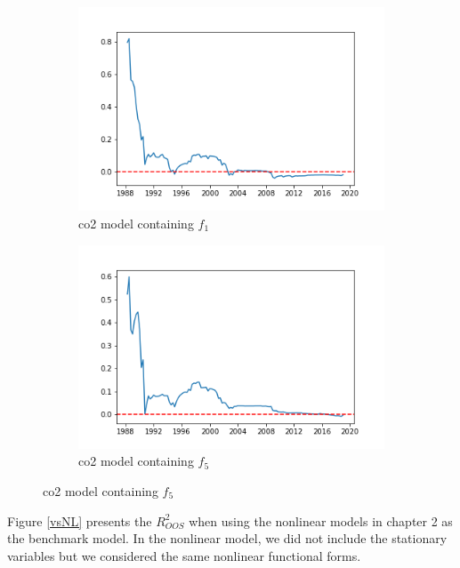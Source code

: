 \documentclass[a4paper,12pt,times,numbered,print,index]{report}
\numberwithin{equation}{section}
\begin{document}
\begin{figure}[!htbp]
	\centering
	\caption{OOS Performance (Benchmark: AR(1) Model)}
	\begin{subfigure}[b]{0.42\linewidth}
		\includegraphics[width=1.2\linewidth]{plots/co2_AR1_g1.png}
		\caption{co2 model containing $f_1$}
	\end{subfigure}
	\begin{subfigure}[b]{0.42\linewidth}
		\includegraphics[width=1.2\linewidth]{plots/co2_AR1_g5.png}
		\caption{co2 model containing $f_5$}
	\end{subfigure}
	\label{vsAR1}
\end{figure}

Figure \ref{vsNL} presents the $R^2_{OOS}$ when using the nonlinear models in chapter 2 as the benchmark model. In the nonlinear model, we did not include the stationary variables but we considered the same nonlinear functional forms. 
\end{document}
